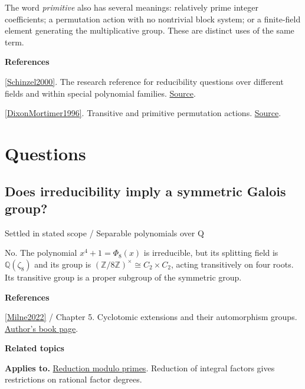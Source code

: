 \documentclass[11pt,a4paper,oneside,openany]{book}
\newenvironment{sources}{\par\smallskip\begingroup\footnotesize\color{atlasgray}\leftskip=10pt\setlength{\parskip}{2pt}}{\par\endgroup\smallskip}
\begin{document}
\color{black} The word \emph{primitive} also has several meanings: relatively prime integer coefficients; a permutation action with no nontrivial block system; or a finite-field element generating the multiplicative group. These are distinct uses of the same term.\par
\begin{sources}
\textbf{References}\par\smallskip
\noindent\hyperlink{ref:Schinzel2000}{[Schinzel2000]}. The research reference for reducibility questions over different fields and within special polynomial families. \href{https://doi.org/10.1017/CBO9780511542916}{Source}.\par
\noindent\hyperlink{ref:DixonMortimer1996}{[DixonMortimer1996]}. Transitive and primitive permutation actions. \href{https://link.springer.com/book/10.1007/978-1-4612-0731-3}{Source}.\par
\end{sources}\color{black}
\section*{Questions}
\subsection*{Does irreducibility imply a symmetric Galois group?}
{\small\sffamily\color{atlasgold}Settled in stated scope / Separable polynomials over Q}\par\smallskip
\color{black} No. The polynomial \(x^4+1=\Phi_8(x)\) is irreducible, but its splitting field is \(\mathbb Q(\zeta_8)\) and its group is \((\mathbb Z/8\mathbb Z)^\times\cong C_2\times C_2\), acting transitively on four roots. Its transitive group is a proper subgroup of the symmetric group.\par
\begin{sources}
\textbf{References}\par\smallskip
\noindent\hyperlink{ref:Milne2022}{[Milne2022]} / Chapter 5. Cyclotomic extensions and their automorphism groups. \href{https://www.jmilne.org/math/Books/index.html}{Author's book page}.\par
\end{sources}\color{black}
\par\medskip\begingroup\footnotesize\setlength{\parskip}{1pt}\textbf{\sffamily\color{atlasgreen}Related topics}\par
\color{black}\textbf{Applies to.} \hyperlink{article:modular-irreducibility}{Reduction modulo primes}. Reduction of integral factors gives restrictions on rational factor degrees.\par
\end{document}
